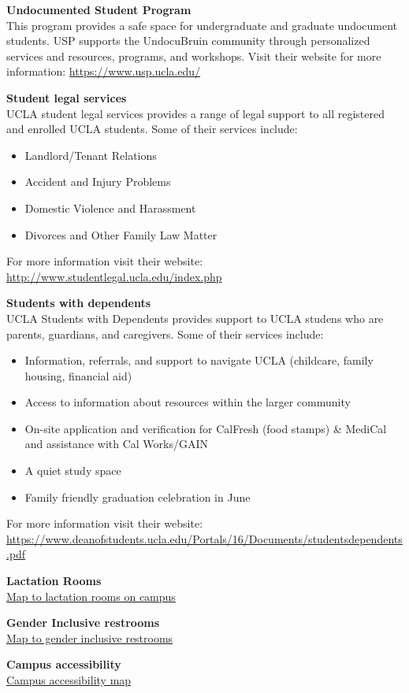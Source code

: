 \documentclass[11pt,]{article}
\providecommand{\tightlist}{%
  \setlength{\itemsep}{0pt}\setlength{\parskip}{0pt}}
\begin{document}
\textbf{Undocumented Student Program}\\
This program provides a safe space for undergraduate and graduate
undocument students. USP supports the UndocuBruin community through
personalized services and resources, programs, and workshops. Visit
their website for more information: \url{https://www.usp.ucla.edu/}

\textbf{Student legal services}\\
UCLA student legal services provides a range of legal support to all
registered and enrolled UCLA students. Some of their services include:

\begin{itemize}
\tightlist
\item
  Landlord/Tenant Relations\\
\item
  Accident and Injury Problems\\
\item
  Domestic Violence and Harassment\\
\item
  Divorces and Other Family Law Matter
\end{itemize}

For more information visit their website:
\url{http://www.studentlegal.ucla.edu/index.php}

\textbf{Students with dependents}\\
UCLA Students with Dependents provides support to UCLA studens who are
parents, guardians, and caregivers. Some of their services include:

\begin{itemize}
\tightlist
\item
  Information, referrals, and support to navigate UCLA (childcare,
  family housing, financial aid)\\
\item
  Access to information about resources within the larger community\\
\item
  On-site application and verification for CalFresh (food stamps) \&
  MediCal and assistance with Cal Works/GAIN\\
\item
  A quiet study space\\
\item
  Family friendly graduation celebration in June
\end{itemize}

For more information visit their website:
\url{https://www.deanofstudents.ucla.edu/Portals/16/Documents/studentsdependents.pdf}

\textbf{Lactation Rooms}\\
\href{https://map.ucla.edu/?f=5}{Map to lactation rooms on campus}

\textbf{Gender Inclusive restrooms}\\
\href{http://maps.ucla.edu/campus/?a_layers=flyr_restrooms}{Map to
gender inclusive restrooms}

\textbf{Campus accessibility}\\
\href{https://maps.ucla.edu/downloads/pdf/Access_08_21_15.pdf}{Campus
accessibility map}
\end{document}
